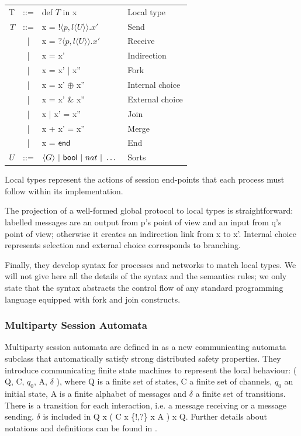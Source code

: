 \documentclass[a4paper,11pt,twoside]{report}
\newcommand{\kf}[1]{\textup{\textsf{#1}}\xspace}
\newcommand{\T}{\ensuremath{T}}
\newcommand{\UT}{\ensuremath{U}}
\newcommand{\End}{\kf{end}}
\newcommand{\Bool}{\kf{bool}}
\begin{document}
\begin{center}
\begin{tabular}{rcll}
T & ::= & def $\T$ in x & Local type \\
$\T$ & ::= & x  = $!\langle p, l \langle \UT \rangle \rangle.x' $ & Send\\
 & | & x  = $?\langle p, l \langle \UT \rangle \rangle.x' $ & Receive\\
& | & x = x' & Indirection\\
& | & x = x' | x'' & Fork\\
& | & x = x' $\oplus$ x'' & Internal choice\\ 
& | & x = x' \& x'' & External choice\\
& | & x | x' = x'' & Join\\
& | & x + x' = x'' & Merge\\
& | & x = $\End$ & End\\
\UT & ::= &$ \langle G\rangle\ |\ \Bool\ |\ nat \ |\ \ldots\ $ & Sorts
\end{tabular}
\end{center}

Local types represent the actions of session end-points that each process must follow within its implementation.

The projection of a well-formed global protocol to local types is straightforward: labelled messages are an output from p's point of view and an input from q's point of view; otherwise it creates an indirection link from x to x'. Internal choice represents selection and external choice corresponds to branching.

Finally, they develop syntax for processes and networks to match local types. We will not give here all the details of the syntax and the semantics rules; we only state that the syntax abstracts the control flow of any standard programming language equipped with fork and join constructs.



\subsubsection{Multiparty Session Automata}
Multiparty session automata are defined in \cite{denielou2012multiparty} as a new communicating automata subclass that automatically satisfy strong distributed safety properties. They introduce communicating finite state machines to represent the local behaviour: ( Q, C, $q_0$, A, $\delta$ ), where Q is a finite set of states, C a finite set of channels, $q_0$ an initial state, A is a finite alphabet of messages and $\delta$ a finite set of transitions. There is a transition for each interaction, i.e. a message receiving or a message sending. $\delta$ is included in Q x ( C x \{!,?\} x A ) x Q. Further details about notations and definitions can be found in \cite{denielou2012multiparty}.
\end{document}

